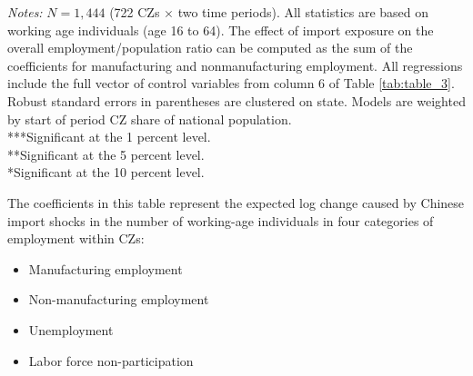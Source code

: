 \begin{frame}
\begin{table}[ht]
        \begin{minipage}{\linewidth}
            \tiny
            \textit{Notes:} $N = 1,444$ (722 CZs $\times$ two time periods). All statistics are based on working age individuals (age 16 to 64). The effect of import exposure on the overall employment/population ratio can be computed as the sum of the coefficients for manufacturing and nonmanufacturing employment. All regressions include the full vector of control variables from column 6 of Table \ref{tab:table_3}. Robust standard errors in parentheses are clustered on state. Models are weighted by start of period CZ share of national population. \\
            ***Significant at the 1 percent level. \\
            **Significant at the 5 percent level. \\
            *Significant at the 10 percent level.
        \end{minipage}
    \end{table}
    \small{
    The coefficients in this table represent the expected log change caused by Chinese import shocks in the number of working-age individuals in four categories of employment within CZs: 
        
    \begin{itemize}
        \item Manufacturing employment
        \item Non-manufacturing employment
        \item Unemployment
        \item Labor force non-participation
    \end{itemize}
    }
\end{frame}



